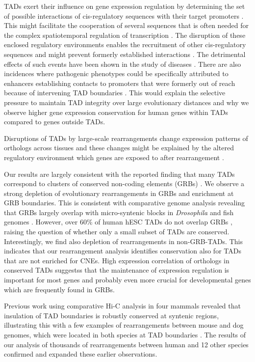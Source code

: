 \documentclass[a4paper,twoside=true,openright,parskip=full,chapterprefix=true,11pt,headings=normal,bibliography=totoc,listof=totoc,titlepage=on,captions=tableabove,draft=false]{scrreprt}
\theoremstyle{definition}
\theoremstyle{definition}
\theoremstyle{definition}
\theoremstyle{remark}
\begin{document}
TADs exert their influence on gene expression regulation by determining
the set of possible interactions of cis-regulatory sequences with their
target promoters \citep{Nora2012, Symmons2014, Schoenfelder2015}. This
might facilitate the cooperation of several sequences that is often
needed for the complex spatiotemporal regulation of transcription
\citep{Andrey2017}. The disruption of these enclosed regulatory
environments enables the recruitment of other cis-regulatory sequences
and might prevent formerly established interactions
\citep{Montavon2012}. The detrimental effects of such events have been
shown in the study of diseases \citep{Redin2017, Zepeda-Mendoza2017}.
There are also incidences where pathogenic phenotypes could be
specifically attributed to enhancers establishing contacts to promoters
that were formerly out of reach because of intervening TAD boundaries
\citep{Ibn-Salem2014, Lupianez2015, Spielmann2012}. This would explain
the selective pressure to maintain TAD integrity over large evolutionary
distances and why we observe higher gene expression conservation for
human genes within TADs compared to genes outside TADs.

Disruptions of TADs by large-scale rearrangements change expression
patterns of orthologs across tissues and these changes might be
explained by the altered regulatory environment which genes are exposed
to after rearrangement \citep{Farre2015}.

Our results are largely consistent with the reported finding that many
TADs correspond to clusters of conserved non-coding elements (GRBs)
\citep{Harmston2017}. We observe a strong depletion of evolutionary
rearrangements in GRBs and enrichment at GRB boundaries. This is
consistent with comparative genome analysis revealing that GRBs largely
overlap with micro-syntenic blocks in \emph{Drosophila}
\citep{Engstrom2007} and fish genomes \citep{Dimitrieva2013}. However,
over 60\% of human hESC TADs do not overlap GRBs \citep{Harmston2017},
raising the question of whether only a small subset of TADs are
conserved. Interestingly, we find also depletion of rearrangements in
non-GRB-TADs. This indicates that our rearrangement analysis identifies
conservation also for TADs that are not enriched for CNEs. High
expression correlation of orthologs in conserved TADs suggestss that the
maintenance of expression regulation is important for most genes and
probably even more crucial for developmental genes which are frequently
found in GRBs.

Previous work using comparative Hi-C analysis in four mammals revealed
that insulation of TAD boundaries is robustly conserved at syntenic
regions, illustrating this with a few examples of rearrangements between
mouse and dog genomes, which were located in both species at TAD
boundaries \citep{VietriRudan2015}. The results of our analysis of
thousands of rearrangements between human and 12 other species confirmed
and expanded these earlier observations.
\end{document}
